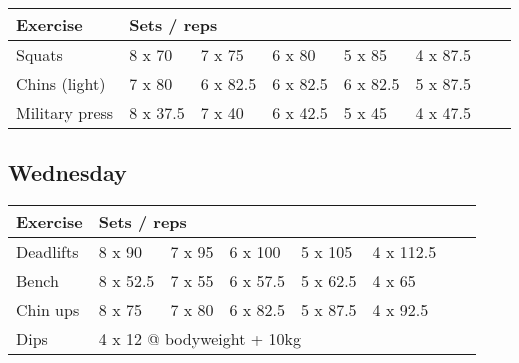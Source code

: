 \documentclass[12pt, a4paper]{article}%
\begin{document}
  \begin{tabular}{l|lllllll}
  \hspace{0.75em} \textbf{Exercise} & \multicolumn{ 7 }{l}{ \textbf{Sets / reps} } \\ \hline

            \hspace{0.75em} Squats
            & 8 x 70
            & 7 x 75
            & 6 x 80
            & 5 x 85
            & 4 x 87.5
            & 
            & 
            \\


            \hspace{0.75em} Chins (light)
            & 7 x 80
            & 6 x 82.5
            & 6 x 82.5
            & 6 x 82.5
            & 5 x 87.5
            & 
            & 
            \\


            \hspace{0.75em} Military press
            & 8 x 37.5
            & 7 x 40
            & 6 x 42.5
            & 5 x 45
            & 4 x 47.5
            & 
            & 
            \\


  \end{tabular}

  \subsection*{\hspace{0.5em} Wednesday }


  \begin{tabular}{l|lllllll}
  \hspace{0.75em} \textbf{Exercise} & \multicolumn{ 7 }{l}{ \textbf{Sets / reps} } \\ \hline

            \hspace{0.75em} Deadlifts
            & 8 x 90
            & 7 x 95
            & 6 x 100
            & 5 x 105
            & 4 x 112.5
            & 
            & 
            \\


            \hspace{0.75em} Bench
            & 8 x 52.5
            & 7 x 55
            & 6 x 57.5
            & 5 x 62.5
            & 4 x 65
            & 
            & 
            \\


            \hspace{0.75em} Chin ups
            & 8 x 75
            & 7 x 80
            & 6 x 82.5
            & 5 x 87.5
            & 4 x 92.5
            & 
            & 
            \\


   \hspace{0.75em} Dips &  \multicolumn{ 7 }{l}{ 4 x 12 @ bodyweight + 10kg } \\
  \end{tabular}
\end{document}
